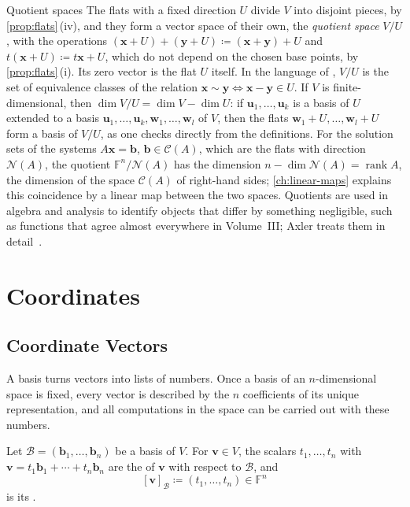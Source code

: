 \begin{note}{Quotient spaces}
The flats with a fixed direction $U$ divide $V$ into disjoint pieces, by \cref{prop:flats}\,(iv), and they form a vector space of their own, the \emph{quotient space} $V/U$, with the operations $(\mathbf x+U)+(\mathbf y+U)\coloneqq(\mathbf x+\mathbf y)+U$ and $t(\mathbf x+U)\coloneqq t\mathbf x+U$, which do not depend on the chosen base points, by \cref{prop:flats}\,(i). Its zero vector is the flat $U$ itself. In the language of , $V/U$ is the set of equivalence classes of the relation $\mathbf x\sim\mathbf y\Leftrightarrow\mathbf x-\mathbf y\in U$. If $V$ is finite-dimensional, then $\dim V/U=\dim V-\dim U$: if $\mathbf u_1,\ldots,\mathbf u_k$ is a basis of $U$ extended to a basis $\mathbf u_1,\ldots,\mathbf u_k,\mathbf w_1,\ldots,\mathbf w_l$ of $V$, then the flats $\mathbf w_1+U,\ldots,\mathbf w_l+U$ form a basis of $V/U$, as one checks directly from the definitions. For the solution sets of the systems $A\mathbf x=\mathbf b$, $\mathbf b\in\mathcal C(A)$, which are the flats with direction $\mathcal N(A)$, the quotient $\mathbb F^n/\mathcal N(A)$ has the dimension $n-\dim\mathcal N(A)=\operatorname{rank}A$, the dimension of the space $\mathcal C(A)$ of right-hand sides; \cref{ch:linear-maps} explains this coincidence by a linear map between the two spaces. Quotients are used in algebra and analysis to identify objects that differ by something negligible, such as functions that agree almost everywhere in Volume~III; Axler treats them in detail~\cite[Sect.~3E]{axler2024}.
\end{note}

\section{Coordinates}
\label{sec:coordinates}

\subsection{Coordinate Vectors}

A basis turns vectors into lists of numbers. Once a basis of an $n$-dimensional space is fixed, every vector is described by the $n$ coefficients of its unique representation, and all computations in the space can be carried out with these numbers.

\begin{definition}[Coordinates]
\label{def:coordinates}
Let $\mathcal B=(\mathbf b_1,\ldots,\mathbf b_n)$ be a basis of $V$. For $\mathbf v\in V$, the scalars $t_1,\ldots,t_n$ with $\mathbf v=t_1\mathbf b_1+\cdots+t_n\mathbf b_n$ are the  of $\mathbf v$ with respect to $\mathcal B$, and
\[
[\mathbf v]_{\mathcal B}\coloneqq(t_1,\ldots,t_n)\in\mathbb F^n
\]
is its .
\end{definition}

